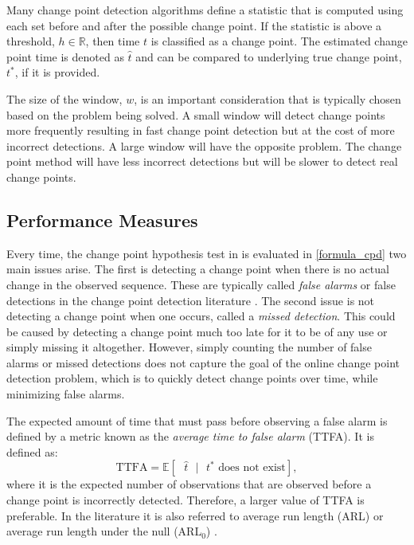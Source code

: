 Many change point detection algorithms define a statistic that is computed using each set before and after the possible change point. If the statistic is above a threshold, $h \in \mathbb{R}$, then time $t$ is classified as a change point. The estimated change point time is denoted as $\hat{t}$ and can be compared to underlying true change point, $t^*$, if it is provided.

The size of the window, $w$, is an important consideration that is typically chosen based on the problem being solved. A small  window will detect change points more frequently resulting in fast change point detection but at the cost of more incorrect detections. A large window will have the opposite problem. The change point method will have less incorrect detections but will be slower to detect real change points.

\subsection{Performance Measures}

Every time, the change point hypothesis test in is evaluated in \ref{formula_cpd} two main issues arise. The first is detecting a change point when there is no actual change in the observed sequence. These are typically called \textit{false alarms} or false detections in the change point detection literature \cite{lee2010change}. The second issue is not detecting a change point when one occurs, called a \textit{missed detection}. This could be caused by detecting a change point much too late for it to be of any use or simply missing it altogether. However, simply counting the number of false alarms or missed detections does not capture the goal of the online change point detection problem, which is to quickly detect change points over time, while minimizing false alarms. 

The expected amount of time that must pass before observing a false alarm is defined by a metric known as the \textit{average time to false alarm} (TTFA). It is defined as:
\begin{equation}
\label{ttfa}
\text{TTFA} = \mathbb{E}[\text{ }  \hat{t} \text{ } |\text{ }  t^* \text{ does not exist} ],
\end{equation}
where it is the expected number of observations that are observed before a change point is incorrectly detected. Therefore, a larger value of TTFA is preferable. In the literature it is also referred to average run length (ARL) or average run length under the null (ARL$_0$) \cite{johnson2017detecting}. 

